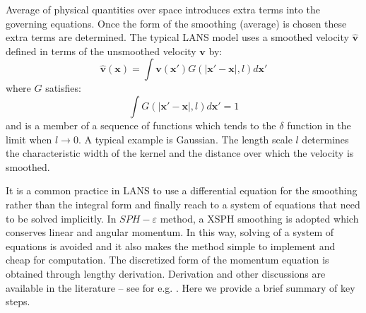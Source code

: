 \documentclass[gmd, manuscript]{copernicus}
\begin{document}
Average of physical quantities over space introduces extra terms into the governing equations. Once the form of the smoothing (average) is chosen these extra terms are determined.
The typical LANS model uses a smoothed velocity $\widehat{\textbf{v}}$ 
defined in terms of the unsmoothed velocity $\textbf{v}$ by:
\begin{equation}
\widehat{\textbf{v}}\left(\textbf{x}\right)=\int \textbf{v}\left(\textbf{x} \prime\right)G\left(\vert \textbf{x} \prime - \textbf{x} \vert, l\right) d\textbf{x} \prime
\end{equation}
where $G$ satisfies:
\begin{equation}
\int G\left(\vert \textbf{x} \prime - \textbf{x} \vert, l\right) d\textbf{x} \prime =1
\end{equation}
and is a member of a sequence of functions which tends to the $\delta$ function in the limit when $ l\rightarrow 0$. A typical example is Gaussian.
The length scale $l$ determines the characteristic width of the kernel and the distance over which the velocity is smoothed.

It is a common practice in LANS to use a differential equation for the smoothing rather than the integral form and finally reach to a system of equations that need to be solved implicitly. In $SPH-\varepsilon$ method, a XSPH \citep{monaghan1989problem} smoothing is adopted which conserves linear and angular momentum. In this way, solving of a system of equations is avoided and it also makes the method simple to implement and cheap for computation. 
The discretized form of the momentum equation is obtained through lengthy derivation. Derivation and other discussions are available in the literature -- see for e.g. \citep{monaghan2011turbulence}. Here we provide a brief summary of key steps.
\end{document}
